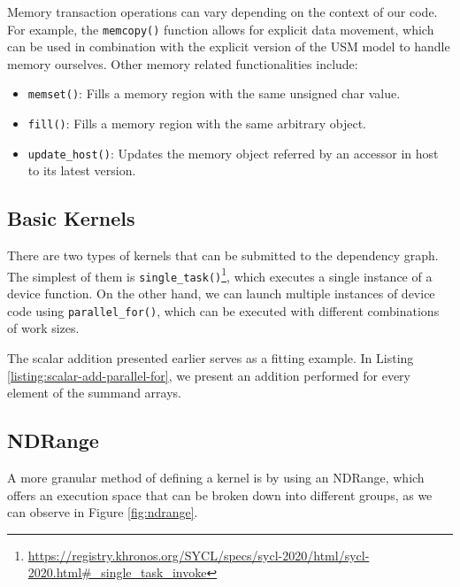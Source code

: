 Memory transaction operations can vary depending on the context of our code.
For example, the \texttt{memcopy()} function allows for explicit data movement, which can be used in combination with the explicit version of the USM model to handle memory ourselves.
Other memory related functionalities include:
\begin{itemize}
    \item \texttt{memset()}: Fills a memory region with the same unsigned char value.
    \item \texttt{fill()}: Fills a memory region with the same arbitrary object.
    \item \texttt{update\_host()}: Updates the memory object referred by an accessor in host to its latest version.
\end{itemize}

\subsection{Basic Kernels}

There are two types of kernels that can be submitted to the dependency graph.
The simplest of them is \texttt{single\_task()}\footnote{\url{https://registry.khronos.org/SYCL/specs/sycl-2020/html/sycl-2020.html\#\_single\_task\_invoke}}, which executes a single instance of a device function.
On the other hand, we can launch multiple instances of device code using \texttt{parallel\_for()}, which can be executed with different combinations of work sizes.



The scalar addition presented earlier serves as a fitting example.
In Listing \ref{listing:scalar-add-parallel-for}, we present an addition performed for every element of the summand arrays.
\pagebreak
\subsection{NDRange}

A more granular method of defining a kernel is by using an NDRange, which offers an execution space that can be broken down into different groups, as we can observe in Figure \ref{fig:ndrange}.

